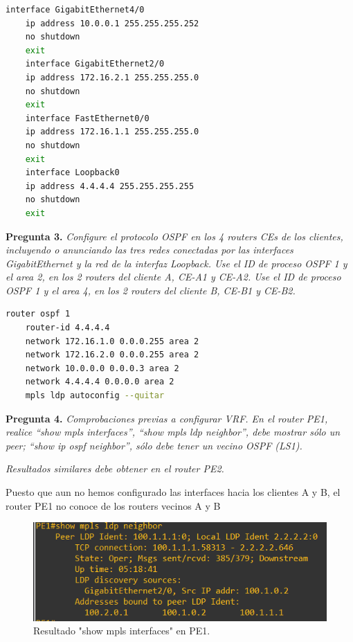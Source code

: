 \documentclass[a4paper, 12pt]{report}
\begin{document}
\begin{lstlisting}[language=bash, caption={Configuración IPs en el Router CE-A1}]
    interface GigabitEthernet4/0
    ip address 10.0.0.1 255.255.255.252
    no shutdown
    exit
    interface GigabitEthernet2/0
    ip address 172.16.2.1 255.255.255.0
    no shutdown
    exit
    interface FastEthernet0/0
    ip address 172.16.1.1 255.255.255.0
    no shutdown
    exit
	interface Loopback0
    ip address 4.4.4.4 255.255.255.255
    no shutdown
    exit
\end{lstlisting}

\textbf{Pregunta 3.}
\textit{Configure el protocolo OSPF en los 4 routers CEs de los clientes, incluyendo o anunciando
las tres redes conectadas por las interfaces GigabitEthernet y la red de la interfaz Loopback.
Use el ID de proceso OSPF 1 y el area 2, en los 2 routers del cliente A, CE-A1 y CE-A2.
Use el ID de proceso OSPF 1 y el area 4, en los 2 routers del cliente B, CE-B1 y CE-B2.}

\begin{lstlisting}[language=bash, caption={Configuración OSPF en el Router CE-A1}]
    router ospf 1
    router-id 4.4.4.4
    network 172.16.1.0 0.0.0.255 area 2
    network 172.16.2.0 0.0.0.255 area 2
    network 10.0.0.0 0.0.0.3 area 2
    network 4.4.4.4 0.0.0.0 area 2
    mpls ldp autoconfig --quitar
\end{lstlisting}
\newpage
\textbf{Pregunta 4.}
\textit{Comprobaciones previas a configurar VRF. En el router PE1, realice “show mpls interfaces”, “show mpls ldp neighbor”, debe mostrar sólo un peer; “show ip ospf neighbor”, sólo debe tener un vecino OSPF (LS1).}

\textit{Resultados similares debe obtener en el router PE2.}

Puesto que aun no hemos configurado las interfaces hacia los clientes A y B, el router PE1 no conoce de los routers vecinos A y B

\begin{figure}[H]
	\centering
	\includegraphics[scale=0.7]{neighborpe1.png}
	\caption{Resultado "show mpls interfaces" en PE1.}
	\label{fig:neighborpe1}
\end{figure}
\end{document}
